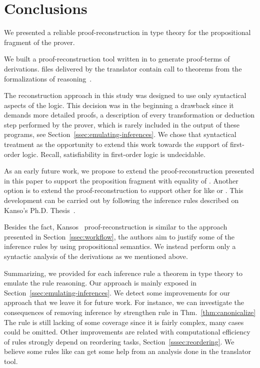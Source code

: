 \documentclass[../main.tex]{subfiles}
\begin{document}

\section{Conclusions}
\label{sec:conclusions}

We presented a reliable proof-reconstruction in type theory
for the propositional fragment of the \Metis prover.

We built a proof-reconstruction tool written in \Haskell
to generate \Agda proof-terms of \Metis \TSTP derivations.
\Agda files delivered by the translator contain call to theorems from the
\Agda formalizations of \Metis reasoning~\cite{AgdaProp,AgdaMetis}.

The reconstruction approach in this study was designed to use
only syntactical aspects of the logic.
This decision was in the beginning a drawback
since it demands more detailed proofs, a
description of every transformation or deduction step performed by
the prover, which is rarely included in the output of these programs,
see Section~\ref{ssec:emulating-inferences}.
We chose that syntactical treatment as the opportunity
to extend this work towards the support of first-order logic.
Recall, satisfiability in first-order logic is undecidable.

As an early future work, we propose to extend the
proof-reconstruction presented in this paper to support the
proposition fragment with equality of \Metis.
Another option is to extend the proof-reconstruction to support other \ATPs for \CPL like  or .
This development can be carried out by following the 
inference rules described on Kanso's Ph.D. Thesis~\cite{Kanso2012}.

Besides the fact, Kansos~\cite{Kanso2012} proof-reconstruction is
similar to the approach presented in Section~\ref{ssec:workflow},
the authors aim to justify some of the inference
rules by using propositional semantics. We instead perform only a syntactic analysis of the derivations as we mentioned above.

Summarizing, we provided for each \Metis inference rule a theorem in
type theory to emulate the rule reasoning. Our approach is mainly
exposed in Section~\ref{ssec:emulating-inferences}.
We detect some improvements for our approach that we leave it for future
work.
For instance, we can investigate the consequences of removing \clausify
inference by strengthen \canonicalize rule in Thm.~\ref{thm:canonicalize}
The \simplify rule is still lacking of some coverage since it is fairly complex, many cases could be omitted.
Other improvements are related with computational efficiency of
rules strongly depend on reordering tasks,
Section~\ref{sssec:reordering}.
We believe some rules like \canonicalize can get some help from an analysis done in the translator tool.
\end{document}

